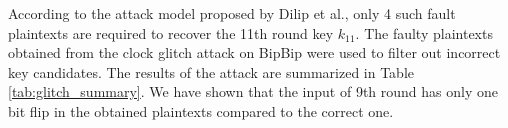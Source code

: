 According to the attack model proposed by Dilip et al., only 4 such fault plaintexts are required to recover the 11th round key $k_{11}$. The faulty plaintexts obtained from the clock glitch attack on BipBip were used to filter out incorrect key candidates. The results of the attack are  summarized in Table \ref{tab:glitch_summary}. We have shown that the input of 9th round has only one bit flip in the obtained plaintexts compared to the correct one.
    